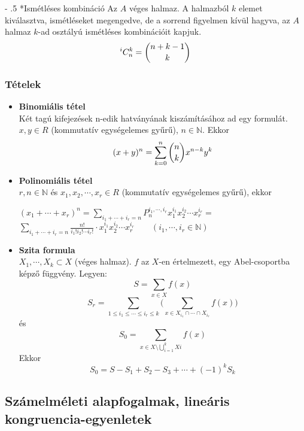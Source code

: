 \documentclass[12pt,margin=0px]{article}
\makeatletter
\newcommand\ddfrac[2]{\frac{\displaystyle #1}{\displaystyle #2}}
\newcommand{\N}{\mathbb{N}}
\renewcommand\paragraph{%
	\@startsection{paragraph}{4}{0mm}%
	{-\baselineskip}%
	{.5\baselineskip}%
	{\normalfont\normalsize\bfseries}}
\makeatother
\begin{document}
    \paragraph*{Ismétléses kombináció}
         Az $A$ véges halmaz. A halmazból $k$ elemet kiválasztva, ismétléseket megengedve, de a sorrend figyelmen kívül hagyva, az $A$ halmaz $k$-ad osztályú ismétléses kombinációit kapjuk.
         \[^iC_n^k = \dbinom{n+k-1}{k} \]

    \subsubsection*{Tételek}
    \begin{itemize}[leftmargin=5.5mm]
        \renewcommand{\labelitemi}{$\vcenter{\hbox{\tiny$\bullet$}}$}
         \item \textbf{Binomiális tétel} \\
            Két tagú kifejezések n-edik hatványának kiszámításához ad egy formulát.\\
         	$x,y \in R$  (kommutatív egységelemes gyűrű), $n \in \mathbb{N}$. Ekkor
         	\[(x+y)^n = \sum\limits_{k=0}^n\dbinom{n}{k}x^{n-k}y^{k} \]
         \item \textbf{Polinomiális tétel} \\
         	$r,n\in\N$ és $x_1, x_2, \cdots, x_r \in R$ (kommutatív egységelemes gyűrű), ekkor
         \begin{center}
            $(x_1+\cdots+x_r)^n = \sum\limits_{i_1+\cdots+i_r = n}P_n^{i_1,\cdots,i_r}x_1^{i_1}x_2^{i_2}\cdots x_r^{i_r} =$\\
            $\sum\limits_{i_1+\cdots+i_r = n}\ddfrac{n!}{i_1!i_2!\cdots i_r!} \cdot x_1^{i_1}x_2^{i_2}\cdots x_r^{i_r} \qquad (i_1,\cdots,i_r \in\N)$
         \end{center}
         \item \textbf{Szita formula} \\
         $X_1,\cdots,X_k \subset X$ (véges halmaz). $f$ az $X$-en értelmezett, egy Abel-csoportba képző függvény. Legyen:
         \[S=\sum\limits_{x\in X}f(x)\]
         \[ S_r = \sum\limits_{1\leq i_1 \leq \cdots \leq i_r \leq k}\Bigg(\sum\limits_{x \in X_{i_1} \cap \cdots \cap X_{i_r}}f(x)\Bigg) \]
         és
         \[S_0 = \sum\limits_{x\in X \setminus \bigcup\limits_{i=1}^{k} Xi}f(x)\]
         Ekkor
         \[S_0 = S - S_1+S_2-S_3+\cdots+(-1)^kS_k \]
         \end{itemize}

\subsection*{Számelméleti alapfogalmak, lineáris kongruencia-egyenletek\\}
\end{document}
